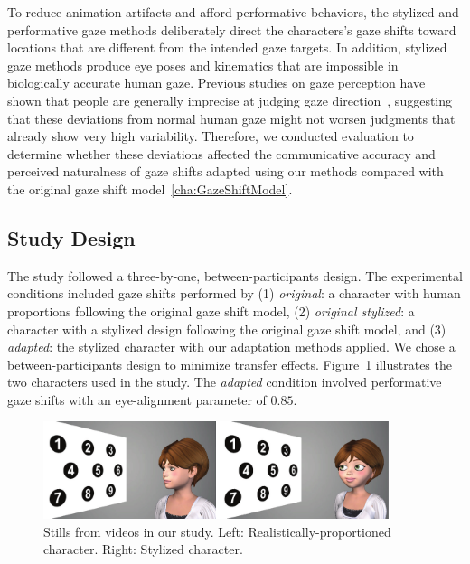 To reduce animation artifacts and afford performative behaviors, the stylized and performative gaze methods deliberately direct the characters's gaze shifts toward locations that are different from the intended gaze targets. In addition, stylized gaze methods produce eye poses and kinematics that are impossible in biologically accurate human gaze. Previous studies on gaze perception have shown that people are generally imprecise at judging gaze direction~\citep{argyle1976gaze}, suggesting that these deviations from normal human gaze might not worsen judgments that already show very high variability. Therefore, we conducted evaluation to determine whether these deviations affected the communicative accuracy and perceived naturalness of gaze shifts adapted using our methods compared with the original gaze shift model~\ref{cha:GazeShiftModel}.

\subsection{Study Design}

The study followed a three-by-one, between-participants design. The experimental conditions included gaze shifts performed by (1) \textit{original}: a character with human proportions following the original gaze shift model, (2) \textit{original stylized}: a character with a stylized design following the original gaze shift model, and (3) \textit{adapted}: the stylized character with our adaptation methods applied. We chose a between-participants design to minimize transfer effects. Figure~\ref{fig:StudyTask} illustrates the two characters used in the study. The \textit{adapted} condition involved performative gaze shifts with an eye-alignment parameter of $0.85$.

\begin{figure}
\centering
\includegraphics[width=0.9\textwidth]{stylizedgaze/Figures/StudyTask-small.pdf}
\caption{Stills from videos in our study. Left: Realistically-proportioned character. Right: Stylized character.}
\vspace{-12pt}
\label{fig:StudyTask}
\end{figure}

